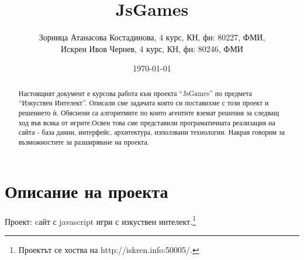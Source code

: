 \documentclass[a4paper]{article}
\def\jsg{JsGames}
\def\jsurl{http://iskren.info:50005/}
\begin{document}
\title{\jsg}
\author{
Зорница Атанасова Костадинова, 4 курс, КН, фн: 80227, ФМИ, \\
Искрен Ивов Чернев, 4 курс, КН, фн: 80246, ФМИ
}
\date{\today}
\maketitle


\begin{abstract}
Настоящият документ е курсова работа към проекта ``\jsg'' по предмета
``Изкуствен Интелект''. Описали сме задачата която си поставихме с този проект
и решението ѝ. Обяснени са алгоритмите по които агентите вземат решения за
следващ ход във всяка от игрите.Освен това сме представили програматичната
реализация на сайта - база данни, интерфейс, архитектура, използвани
технологии. Накрая говорим за възможностите за разширяване на проекта.

\end{abstract}
\newpage

\setcounter{tocdepth}{2}
\tableofcontents
\newpage


\section{Описание на проекта}

Проект: cайт с javascript игри с изкуствен интелект.\footnote{Проектът се хоства на \jsurl.}
\end{document}

